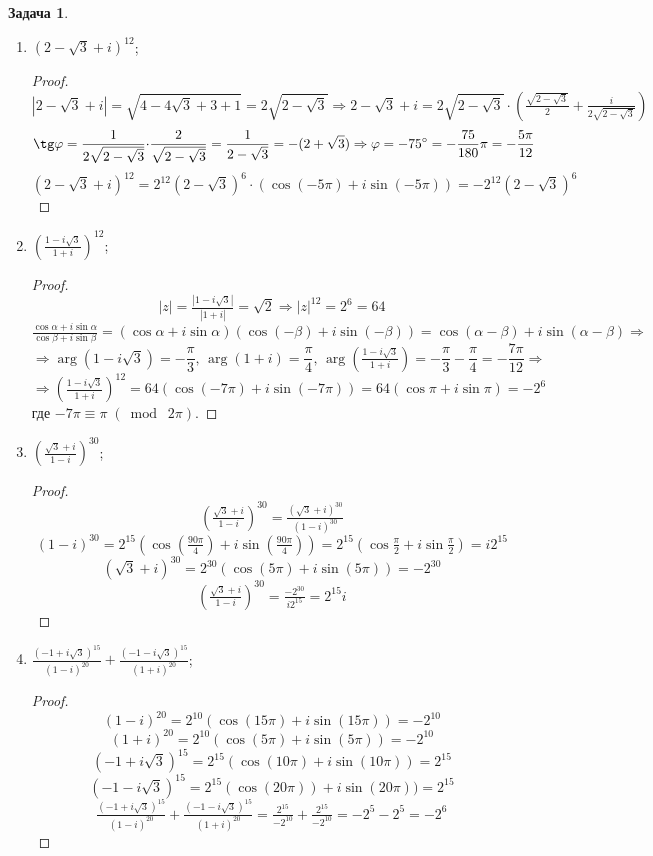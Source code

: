 \documentclass[12pt]{article}
\theoremstyle{definition}
\newtheorem{problem}{Задача}
\newcommand{\modn}[3]{#1 \equiv #2 \; (\bmod \; #3)}
\begin{document}
\begin{problem}
\begin{enumerate}[label=\asbuk*)]
\begin{proof}
$$			$$
		\end{proof}
		\item $(2 - \sqrt{3} + i)^{12}$;
		\begin{proof}
			$$
				\left|2 - \sqrt{3} + i\right| = \sqrt{4 -4\sqrt{3} + 3 + 1} = 2\sqrt{2 - \sqrt{3}} \Rightarrow 2 - \sqrt{3} + i = 2\sqrt{2 - \sqrt{3}}{\cdot}\left(\tfrac{\sqrt{2 - \sqrt{3}}}{2} + \tfrac{i}{2\sqrt{2 - \sqrt{3}}}\right)
			$$
			$$
				\tg\varphi = \dfrac{1}{2\sqrt{2 - \sqrt{3}}}{\cdot}\dfrac{2}{\sqrt{2 - \sqrt{3}}} = \dfrac{1}{2 - \sqrt{3}} = - (2 + \sqrt{3}) \Rightarrow \varphi = -75^{\circ} = - \dfrac{75}{180}\pi = -\dfrac{5\pi}{12}
			$$
			$$
				(2 - \sqrt{3} + i)^{12} = 2^{12}(2 - \sqrt{3})^6{\cdot}(\cos(-5\pi) + i\sin(-5\pi)) = -2^{12}(2 - \sqrt{3})^6
			$$
		\end{proof}
		\item $\left(\tfrac{1 - i\sqrt{3}}{1 + i}\right)^{12}$;
		\begin{proof}
			$$
				|z| = \tfrac{|1 - i\sqrt{3}|}{|1 + i|} = \sqrt{2} \Rightarrow |z|^{12} = 2^6 = 64
			$$
			$$
				\tfrac{\cos\alpha + i\sin\alpha}{\cos\beta + i\sin\beta} = (\cos\alpha + i \sin\alpha)(\cos(-\beta) + i\sin(-\beta)) = \cos(\alpha - \beta) + i\sin(\alpha - \beta) \Rightarrow
			$$
			$$
				\Rightarrow \arg(1 - i\sqrt{3}) = - \dfrac{\pi}{3}, \, \arg(1 + i) = \dfrac{\pi}{4}, \, \arg\left(\tfrac{1 - i\sqrt{3}}{1 + i}\right) = -\dfrac{\pi}{3} - \dfrac{\pi}{4} = -\dfrac{7\pi}{12} \Rightarrow 
			$$
			$$	
				\Rightarrow \left(\tfrac{1 - i\sqrt{3}}{1 + i}\right)^{12}  =64(\cos(-7\pi) + i\sin(-7\pi)) = 64(\cos\pi + i\sin\pi)= -2^6
			$$
			где $\modn{-7\pi}{\pi}{2\pi}$.
		\end{proof}
		\item $\left(\tfrac{\sqrt{3} + i}{1 - i}\right)^{30}$;
		\begin{proof}
			$$
				\left(\tfrac{\sqrt{3} + i}{1 - i}\right)^{30} = \tfrac{(\sqrt{3} + i)^{30}}{(1 - i)^{30}}
			$$
			$$
				(1 - i)^{30} = 2^{15}(\cos\left(\tfrac{90\pi}{4}\right) + i\sin\left(\tfrac{90\pi}{4}\right)) = 2^{15}(\cos\tfrac{\pi}{2} + i\sin\tfrac{\pi}{2})= i2^{15}
			$$
			$$
				(\sqrt{3} + i)^{30} = 2^{30}\left(\cos(5\pi) + i\sin(5\pi)\right) = -2^{30}
			$$
			$$
				\left(\tfrac{\sqrt{3} + i}{1 - i}\right)^{30} = \tfrac{-2^{30}}{i2^{15}} = 2^{15}i
			$$
		\end{proof}
		\item $\tfrac{(-1 + i\sqrt{3})^{15}}{(1 - i)^{20}} + \tfrac{(-1-i\sqrt{3})^{15}}{(1 + i)^{20}}$;
		\begin{proof}
			$$
				(1 - i)^{20} = 2^{10}(\cos(15\pi) + i\sin(15\pi)) = -2^{10}
			$$
			$$
				(1 + i)^{20} = 2^{10}(\cos(5\pi) + i\sin(5\pi)) = -2^{10}
			$$
			$$
				(-1 + i\sqrt{3})^{15} = 2^{15}(\cos(10\pi) + i\sin(10\pi)) = 2^{15}
			$$
			$$
				(-1-i\sqrt{3})^{15} = 2^{15}(\cos(20\pi)) + i\sin(20\pi)) = 2^{15}
			$$
			$$
				\tfrac{(-1 + i\sqrt{3})^{15}}{(1 - i)^{20}} + \tfrac{(-1-i\sqrt{3})^{15}}{(1 + i)^{20}} = \tfrac{2^15}{-2^{10}} + \tfrac{2^{15}}{-2^{10}} = -2^5 - 2^5 = -2^6
			$$	
		\end{proof}
	\end{enumerate}
\end{problem}
\end{document}
